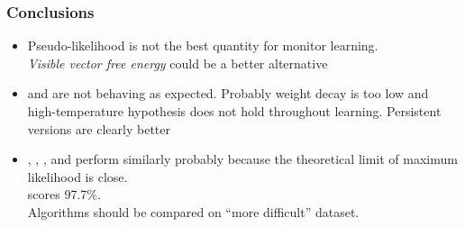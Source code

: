 
\begin{frame}
  \frametitle{Conclusions}
  \begin{itemize}[<+->]
    \item Pseudo-likelihood is not the best quantity for monitor learning.\\
    \emph{Visible vector free energy} could be a better alternative
    \item {} and  are not behaving as expected. Probably weight decay is
          too low and high-temperature hypothesis does not hold throughout learning. Persistent versions are clearly better
    \item {}, , , and  perform similarly probably because the theoretical limit of maximum likelihood is close.\\
           scores 97.7\%. \\
          Algorithms should be compared on ``more difficult''  dataset.
  \end{itemize}
\end{frame}

